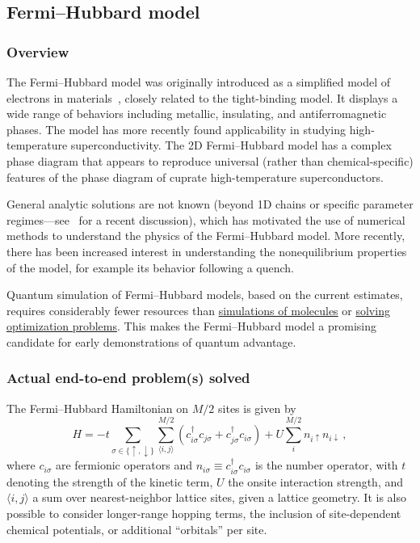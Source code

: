 \begin{refsection}
\subsection{Fermi--Hubbard model}\label{appl:FermiHubbard} 


\subsubsection*{Overview}


The Fermi--Hubbard model was originally introduced as a simplified model of electrons in materials~\cite{hubbard1963Hubbard}, closely related to the tight-binding model. It displays a wide range of behaviors including metallic, insulating, and antiferromagnetic phases. The model has more recently found applicability in studying high-temperature superconductivity. The 2D Fermi--Hubbard model has a complex phase diagram that appears to reproduce universal (rather than chemical-specific) features of the phase diagram of cuprate high-temperature superconductors. 

General analytic solutions are not known (beyond 1D chains or specific parameter regimes---see~\cite{Arovas2022HubbardModel} for a recent discussion), which has motivated the use of numerical methods to understand the physics of the Fermi--Hubbard model. More recently, there has been increased interest in understanding the nonequilibrium properties of the model, for example its behavior following a quench.


Quantum simulation of Fermi--Hubbard models, based on the current estimates, requires considerably fewer resources than \hyperref[appl:QuantumChemistry]{simulations of molecules} or \hyperref[appl:CombOpt]{solving optimization problems}. This makes the Fermi--Hubbard model a promising candidate for early demonstrations of quantum advantage.







\subsubsection*{Actual end-to-end problem(s) solved}
The Fermi--Hubbard Hamiltonian on $M/2$ sites
is given by 
\begin{equation}\label{hamiltonianHubbard}
H= -t \sum_{\sigma \in \{\uparrow,\downarrow\}}\sum_{\langle i,j\rangle}^{M/2} (c_{i\sigma}^\dagger c_{j\sigma}+c_{j\sigma}^\dagger c_{i\sigma})+U \sum_{i}^{M/2} n_{i\uparrow} n_{i\downarrow}\,,
\end{equation}
where $c_{i\sigma}$ are fermionic operators and $n_{i\sigma} \equiv c_{i\sigma}^\dagger c_{i\sigma}$ is the number operator,
with $t$ denoting the strength of the kinetic term, $U$ the onsite interaction strength, and $\langle i,j\rangle$ a sum over nearest-neighbor lattice sites, given a lattice geometry. It is also possible to consider longer-range hopping terms, the inclusion of site-dependent chemical potentials, or additional ``orbitals'' per site.


\end{refsection}
